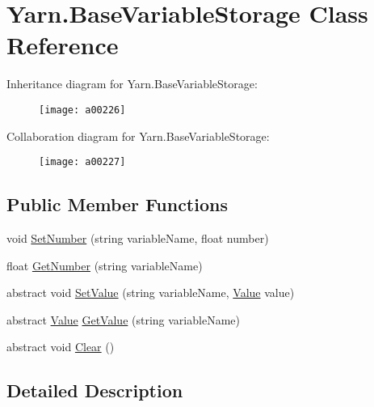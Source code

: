 \hypertarget{a00035}{\section{Yarn.\-Base\-Variable\-Storage Class Reference}
\label{a00035}
}


Inheritance diagram for Yarn.\-Base\-Variable\-Storage\-:
\nopagebreak
\begin{figure}[H]
\begin{center}
\leavevmode
\texttt{[image: a00226]}
\end{center}
\end{figure}


Collaboration diagram for Yarn.\-Base\-Variable\-Storage\-:
\nopagebreak
\begin{figure}[H]
\begin{center}
\leavevmode
\texttt{[image: a00227]}
\end{center}
\end{figure}
\subsection*{Public Member Functions}
\begin{DoxyCompactItemize}
\item 
void \hyperlink{a00035_a48b93de9cd7ae61d0cd9583c8330d3ee}{Set\-Number} (string variable\-Name, float number)
\item 
float \hyperlink{a00035_a1b7f7f4468b2463e7b47986d99362279}{Get\-Number} (string variable\-Name)
\item 
abstract void \hyperlink{a00035_a1c57d6d208b78abec0a670396771448e}{Set\-Value} (string variable\-Name, \hyperlink{a00100}{Value} value)
\item 
abstract \hyperlink{a00100}{Value} \hyperlink{a00035_a13b142df804d9842e97e628e252928e8}{Get\-Value} (string variable\-Name)
\item 
abstract void \hyperlink{a00035_a7e45c37f3662ce9f2643e306bb2b3adc}{Clear} ()
\end{DoxyCompactItemize}


\subsection{Detailed Description}


